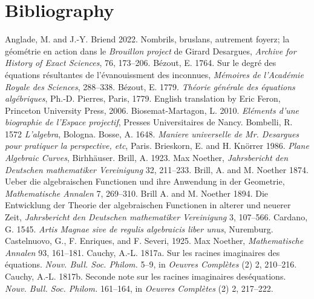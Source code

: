 \section{Bibliography}
\small
\indent Anglade, M. and J.-Y. Briend 2022. Nombrils, bruslans, autrement foyerz; la g\'eom\'etrie en action dans le \emph{Brouillon project} de Girard Desargues, \emph{Archive for History of Exact Sciences}, 76, 173--206.
\newline\indent B\'ezout, E. 1764. Sur le degr\'e des \'equations r\'esultantes de l'\'evanouissment des inconnues, \emph{M\'emoires de l'Acad\'emie Royale des Sciences}, 288--338.
\newline\indent B\'ezout, E. 1779. \emph{Th\'eorie g\'en\'erale des \'equations alg\'ebriques}, Ph.-D. Pierres, Paris, 1779. English translation by Eric Feron, Princeton University Press, 2006.
\newline\indent  Biosemat-Martagon, L. 2010. \emph{El\'ements d'une biographie de l'Espace projectif}, Presses Universitaires de Nancy.
\newline\indent Bombelli, R. 1572 \emph{L'algebra}, Bologna.
\newline\indent Bosse, A.  1648. \emph{Maniere universelle de Mr. Desargues pour pratiquer la perspective, etc}, Paris.
\newline\indent Brieskorn, E. and  H. Kn\"orrer 1986. \emph{Plane Algebraic Curves}, Birhh\"auser.
\newline\indent Brill, A. 1923. Max Noether, \emph{Jahrsbericht den Deutschen mathematiker Vereinigung} 32, 211--233.
\newline\indent Brill, A. and M. Noether  1874.  Ueber die algebraischen Functionen und ihre Anwendung in der Geometrie, \emph{Mathematische Annalen} 7, 269--310.
\newline\indent Brill A. and M. Noether 1894.  Die Entwicklung der Theorie der algebraischen Functionen in alterer und neuerer Zeit, \emph{Jahrsbericht den Deutschen mathematiker Vereinigung} 3, 107--566.
\newline\indent Cardano, G. 1545.  \emph{Artis Magnae sive de regulis algebraicis liber unus}, Nuremburg. 
\newline\indent Castelnuovo, G., F. Enriques, and F. Severi, 1925. Max Noether, \emph{Mathematische Annalen} 93, 161--181.
\newline\indent Cauchy, A.-L. 1817a. Sur les racines imaginaires des \'equations. \emph{Nouv. Bull. Soc. Philom.} 5--9, in  \emph{Oeuvres Compl\`etes} (2) 2, 210--216.
 \newline\indent Cauchy, A.-L. 1817b. Seconde note sur les racines imaginaires des\'equa\-tions. \emph{Nouv. Bull. Soc. Philom.} 161--164, in \emph{Oeuvres Compl\`etes} (2) 2, 217--222.
